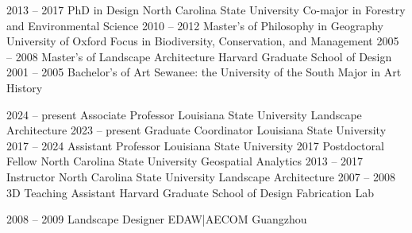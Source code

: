 \documentclass[10pt]{designcv}
\begin{document}
\vspace*{-0.2cm}

\begin{entrylist}
	\entry
		{2013 -- 2017}
		{PhD in Design}
		{North Carolina State University}
		{Co-major in Forestry and Environmental Science}
	\entry
		{2010 -- 2012}
		{Master's of Philosophy in Geography} %
		{University of Oxford}
		{Focus in Biodiversity, Conservation, and Management}
	\entry
		{2005 -- 2008}
		{Master's of Landscape Architecture}
		{Harvard Graduate School of Design}
		{\vspace*{-1em}}
	\entry
		{2001 -- 2005}
		{Bachelor's of Art}
		{Sewanee: the University of the South}
		{Major in Art History}
\end{entrylist}


\vspace*{-0.3cm}

\begin{entrylist}
	\entry
		{2024 -- present}
		{Associate Professor}
		{Louisiana State University}
		{Landscape Architecture}
	\entry
		{2023 -- present}
		{Graduate Coordinator}
		{Louisiana State University}
		{\vspace*{-1em}}
	\entry
		{2017 -- 2024}
		{Assistant Professor}
		{Louisiana State University}
		{\vspace*{-1em}}
	\entry
		{2017}
		{Postdoctoral Fellow}
		{North Carolina State University}
		{Geospatial Analytics}
	\entry
		{2013 -- 2017}
		{Instructor}
		{North Carolina State University}
		{Landscape Architecture}
	\entry
		{2007 -- 2008}
		{3D Teaching Assistant}
		{Harvard Graduate School of Design}
		{Fabrication Lab}
\end{entrylist}

\vspace*{-0.4cm}

\begin{entrylist}
	\entry
		{2008 -- 2009}
		{Landscape Designer}
		{EDAW|AECOM Guangzhou}
		{}
\end{entrylist}

\end{document}
